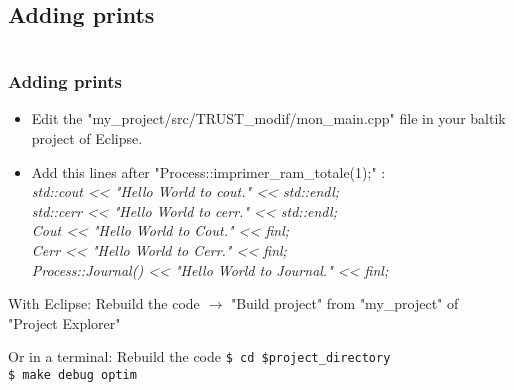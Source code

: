 \documentclass[10pt, hyperref={unicode=true,pdfusetitle, bookmarks=true,bookmarksnumbered=false,bookmarksopen=false, breaklinks=false,pdfborder={0 0 1},backref=true,colorlinks=true,linkcolor=darkblue,pageanchor, urlcolor=darkblue}]{beamer}
\begin{document}
\subsection{{\bf{Adding prints}}}
\begin{frame}
\begin{columns}[c] 
\tableofcontents[sections={1-4},currentsection, currentsubsection]
\tableofcontents[sections={5-8},currentsection, currentsubsection]
\end{columns}
\end{frame}
\begin{frame}
\frametitle{Adding prints}

\begin{block}{}
\begin{itemize}
\item Edit the "my\_project/src/TRUST\_modif/mon\_main.cpp" file in your baltik project of Eclipse.
\item Add this lines after "Process::imprimer\_ram\_totale(1);" :\\
\textit{std::cout <\textcompwordmark{}< "Hello World to cout." <\textcompwordmark{}< std::endl;\\
std::cerr <\textcompwordmark{}< "Hello World to cerr." <\textcompwordmark{}< std::endl;\\
Cout <\textcompwordmark{}< "Hello World to Cout." <\textcompwordmark{}< finl;\\
Cerr <\textcompwordmark{}< "Hello World to Cerr." <\textcompwordmark{}< finl;\\
Process::Journal() <\textcompwordmark{}< "Hello World to Journal." <\textcompwordmark{}< finl;}\\
\end{itemize}
\end{block}

\begin{exampleblock}{With Eclipse: Rebuild the code}
$\rightarrow$ "Build project" from "my\_project" of "Project Explorer"\\
\end{exampleblock}

\begin{block}{Or in a terminal: Rebuild the code}
\texttt{\$ cd \$project\_directory}\\
\texttt{\$ make debug optim}\\
\end{block}

\end{frame}
\end{document}
